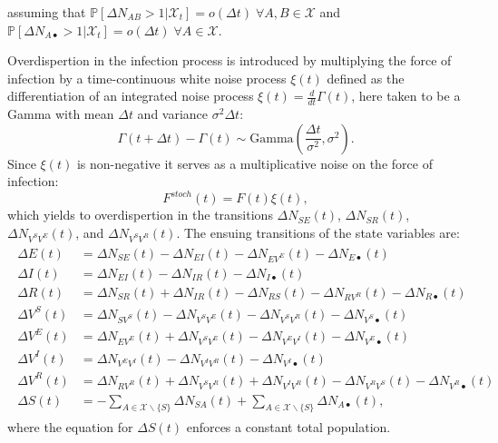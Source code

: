 assuming that \(\mathbb{P}[\Delta N_{AB} > 1|\mathcal{X}_t] = o(\Delta t) \; \forall A,B \in \mathcal{X}\) and \(\mathbb{P}[\Delta N_{A\bullet} > 1|\mathcal{X}_t] = o(\Delta t) \; \forall A \in \mathcal{X}\).

Overdispertion in the infection process is introduced by multiplying
the force of infection by a time-continuous white noise process
\(\xi(t)\) defined as the differentiation of an integrated noise
process \(\xi(t) = \frac{d}{dt}\Gamma(t)\), here taken to be a Gamma
with mean \(\Delta t\) and variance \(\sigma^2 \Delta t\)\cite{Breto:CompoundMarkovCounting:2011}: 
\begin{equation}
\Gamma (t+\Delta t) - \Gamma (t) \sim \text{Gamma}\left( \frac{\Delta t}{\sigma^2}, \sigma^2\right). \label{eqn:sta}
\end{equation}
Since \(\xi(t)\) is non-negative it serves as a multiplicative noise on
the force of infection:
\begin{equation}
F^{stoch}(t) = F(t) \xi(t), \label{eqn:stb}
\end{equation}
which yields to overdispertion in the transitions $\Delta N_{SE}(t)$, $\Delta N_{SR}(t)$, $\Delta N_{V^SV^E}(t)$, and $\Delta N_{V^SV^R}(t)$. The ensuing transitions of the state variables are:
\begin{gather}
\label{eq:stochstates}
\begin{aligned}
    \Delta E(t) &= \Delta N_{SE}(t) -  \Delta N_{EI}(t) - \Delta N_{EV^E}(t) -  \Delta N_{E\bullet}(t)\\
    \Delta I(t) &= \Delta N_{EI}(t) -  \Delta N_{IR}(t) -  \Delta N_{I\bullet}(t)\\
    \Delta R(t) &= \Delta N_{SR}(t) + \Delta N_{IR}(t) -  \Delta N_{RS}(t) -  \Delta N_{RV^R}(t) -  \Delta N_{R\bullet}(t)\\
    \Delta V^S(t) &= \Delta N_{SV^S}(t) -  \Delta N_{V^SV^E}(t) -\Delta N_{V^SV^R}(t) - \Delta N_{V^S\bullet}(t)\\
    \Delta V^E(t) &= \Delta N_{EV^E}(t) + \Delta N_{V^SV^E}(t) -  \Delta N_{V^EV^I}(t) - \Delta N_{V^E\bullet}(t)\\
    \Delta V^I(t) &= \Delta N_{V^EV^I}(t) -  \Delta N_{V^IV^R}(t) - \Delta N_{V^I\bullet}(t)\\
    \Delta V^R(t) &= \Delta N_{RV^R}(t) +  \Delta N_{V^SV^R}(t) +  \Delta N_{V^IV^R}(t) - \Delta N_{V^RV^S}(t) - \Delta N_{V^R\bullet}(t)\\
    \Delta S(t) &= - \sum_{A \in \mathcal{X} \backslash \{S\}} \Delta N_{SA}(t) + \sum_{A \in \mathcal{X} \backslash \{S\}} \Delta N_{A\bullet}(t), 
\end{aligned}
\end{gather}
where the equation for \(\Delta S(t)\) enforces a constant total population.

